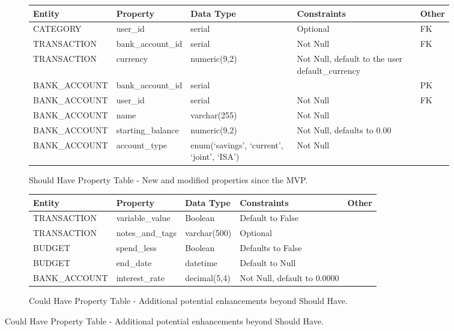 \documentclass{l4proj}
\begin{document}
\begin{figure}[htb]
    \centering
    \begin{subfigure}[b]{1\textwidth}
        \caption{Should Have Property Table - New and modified properties since the MVP.}
        \tiny
        \begin{adjustbox}{max width=\textwidth,center}
        \begin{tabular}{|l|l|l|l|l|}
            \hline
            \textbf{Entity} & \textbf{Property} & \textbf{Data Type} & \textbf{Constraints} & \textbf{Other} \\
            \hline
            CATEGORY & user\_id & serial & Optional & FK \\
            TRANSACTION & bank\_account\_id & serial & Not Null & FK \\
            TRANSACTION & currency & numeric(9,2) & Not Null, default to the user default\_currency & \\
            BANK\_ACCOUNT & bank\_account\_id & serial & & PK \\
            BANK\_ACCOUNT & user\_id & serial & Not Null & FK \\
            BANK\_ACCOUNT & name & varchar(255) & Not Null & \\
            BANK\_ACCOUNT & starting\_balance & numeric(9,2) & Not Null, defaults to 0.00 & \\
            BANK\_ACCOUNT & account\_type & enum(‘savings’, ‘current’, ‘joint’, ‘ISA’) & Not Null & \\
            \hline
        \end{tabular}
        \end{adjustbox}
        \label{fig:syn1}
    \end{subfigure}
    \begin{subfigure}[b]{1\textwidth}
        \caption{Could Have Property Table - Additional potential enhancements beyond Should Have.}
        \tiny
        \begin{adjustbox}{max width=\textwidth,center}
        \begin{tabular}{|l|l|l|l|l|}
            \hline
            \textbf{Entity} & \textbf{Property} & \textbf{Data Type} & \textbf{Constraints} & \textbf{Other} \\
            \hline
            TRANSACTION & variable\_value & Boolean & Default to False & \\
            TRANSACTION & notes\_and\_tags & varchar(500) & Optional & \\
            BUDGET & spend\_less & Boolean & Defaults to False & \\
            BUDGET & end\_date & datetime & Default to Null & \\
            BANK\_ACCOUNT & interest\_rate & decimal(5,4) & Not Null, default to 0.0000 & \\
            \hline
        \end{tabular}
        \end{adjustbox}
        \label{fig:syn2}
    \end{subfigure}


\end{figure}
\end{document}
